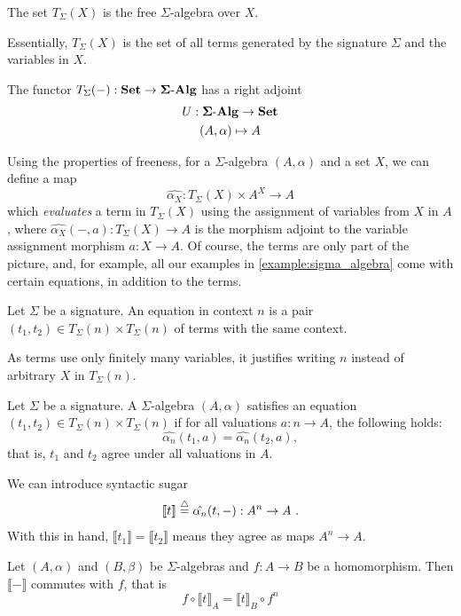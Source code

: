 \begin{proposition}
The set $T_{\Sigma}(X)$ is the free $\Sigma$-algebra over $X$.
\end{proposition}
Essentially, $T_{\Sigma}(X)$ is the set of all terms generated by the signature $\Sigma$ and the variables in $X$.
\begin{proposition}
The functor $T_{\Sigma}(-) : \mathbf{Set} \to \mathbf{\Sigma}\text{-}\mathbf{Alg}$ has a right adjoint 
\begin{gather*}
U : \mathbf{\Sigma}\text{-}\mathbf{Alg} \to \mathbf{Set}\\
(A, \alpha) \mapsto A
\end{gather*}
\end{proposition}
Using the properties of freeness, for a $\Sigma$-algebra $(A, \alpha)$ and a set $X$, we can define a map
\[
\hat{\alpha_{X}} : T_{\Sigma}(X) \times A^X \to A
\]
which \emph{evaluates} a term in $T_{\Sigma}(X)$ using the assignment of variables from $X$ in $A$, where
$\hat{\alpha_{X}}(-, a) : T_{\Sigma}(X) \to A$ is the morphism adjoint to the variable assignment morphism $a : X \to A$.
Of course, the terms are only part of the picture, and, for example, all our examples in \cref{example:sigma_algebra} come with certain equations, in addition to the terms. 
\begin{definition}
Let $\Sigma$ be a signature.
An equation in context $n$ is a pair $(t_1, t_2) \in T_{\Sigma}(n) \times T_{\Sigma}(n)$ of terms with the same context. 
\end{definition}
\begin{remark}
  As terms use only finitely many variables, it justifies writing $n$ instead of arbitrary $X$ in $T_{\Sigma}(n)$.
\end{remark}
\begin{definition}
Let $\Sigma$ be a signature.
A $\Sigma$-algebra $(A, \alpha)$ satisfies an equation $(t_1, t_2) \in T_{\Sigma}(n) \times T_{\Sigma}(n)$ if for all valuations $a : n \to A$, the following holds:
\[
\hat{\alpha_{n}}(t_1, a) = \hat{\alpha_{n}}(t_2, a) ,
\]
that is, $t_1$ and $t_2$ agree under all valuations in $A$.
\end{definition}
\begin{remark}
We can introduce syntactic sugar
\[
\llbracket t \rrbracket \stackrel{\triangle}{=} \hat{\alpha_{n}}(t, -) : A^n \to A~.
\]
With this in hand, $\llbracket t_1 \rrbracket = \llbracket t_2 \rrbracket$ means they agree as maps $A^n \to A$.
\end{remark}
\begin{proposition}\label{prop:homomorphism_commutes}
Let $(A, \alpha)$ and $(B, \beta)$ be $\Sigma$-algebras and $f : A \to B$ be a homomorphism.
Then $\llbracket - \rrbracket$ commutes with $f$, that is
\[
f \circ \llbracket t \rrbracket_A = \llbracket t \rrbracket_{B} \circ f^n
\]
\end{proposition}
